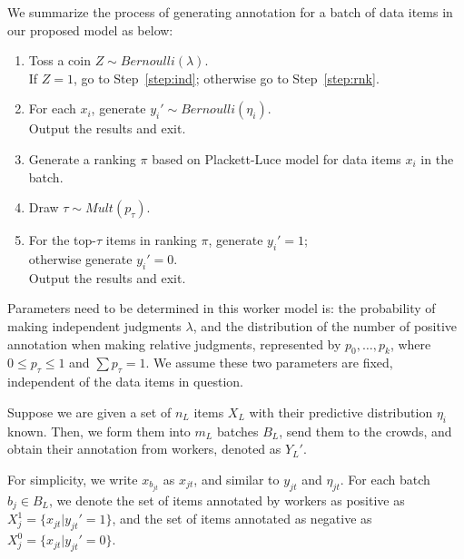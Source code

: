 We summarize the process of generating annotation for a batch of data items in our proposed model as below:
\begin{enumerate}
  \item \label{step:tosscoin}
        Toss a coin $Z \sim Bernoulli(\lambda)$.  \\
        If $Z=1$, go to Step~\ref{step:ind};
        otherwise go to Step~\ref{step:rnk}.
  \item \label{step:ind}
        For each $x_i$, generate $y_i' \sim Bernoulli(\eta_i)$. \\
        Output the results and exit.
  \item \label{step:rnk}
        Generate a ranking $\pi$ based on Plackett-Luce model for data items $x_i$ in the batch.
  \item \label{step:draw}
        Draw $\tau \sim Mult(p_{\tau})$.
  \item \label{step:annotate}
        For the top-$\tau$ items in ranking $\pi$, generate $y_i' = 1$; \\
        otherwise generate $y_i' = 0$.  \\
        Output the results and exit.
\end{enumerate}



Parameters need to be determined in this worker model is:
the probability of making independent judgments $\lambda$,
and the distribution of the number of positive annotation when making relative judgments,
represented by $p_0, \ldots, p_k$, where $0 \leq p_{\tau} \leq 1$ and $\sum p_{\tau} = 1$.
We assume these two parameters are fixed, 
independent of the data items in question.  

Suppose we are given a set of $n_L$ items $X_L$ with their predictive distribution $\eta_i$ known. %
Then, we form them into $m_L$ batches $B_L$, send them to the crowds,
and obtain their annotation from workers, denoted as $Y_L'$.


For simplicity, we write $x_{b_{jt}}$ as $x_{jt}$, and similar to $y_{jt}$ and $\eta_{jt}$.
For each batch $b_j \in B_L$, we denote the set of items annotated by workers as positive as $X_{j}^1 = \{x_{jt} | y_{jt}' = 1\}$,
and the set of items annotated as negative as $X_{j}^0 = \{x_{jt} | y_{jt}' = 0\}$.


